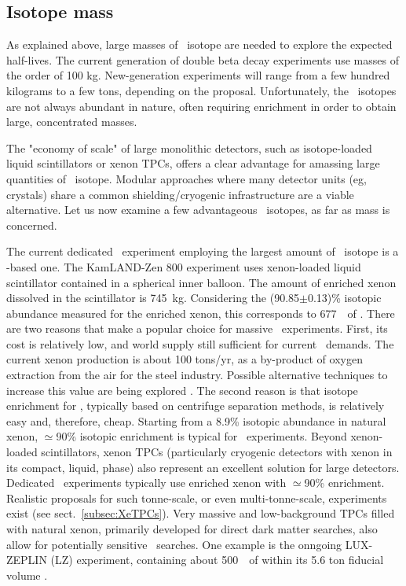 \subsection{Isotope mass} \label{subsec:isotope_mass}

As explained above, large masses of \bb\ isotope are needed to explore the expected half-lives. The current generation of double beta decay experiments use masses of the order of 100 kg. New-generation experiments will range from a few hundred kilograms to a few tons, depending on the proposal. Unfortunately, the \bb\ isotopes are not always abundant in nature, often requiring enrichment in order to obtain large, concentrated masses.

The "economy of scale" of large monolithic detectors, such as isotope-loaded liquid scintillators or xenon TPCs, offers a clear advantage for amassing large quantities of \bb\ isotope. Modular approaches where many detector units (eg, crystals) share a common shielding/cryogenic infrastructure are a viable alternative. Let us now examine a few advantageous \bb\ isotopes, as far as mass is concerned.

The current dedicated \bbonu\ experiment employing the largest amount of \bb\ isotope is a -based one. The KamLAND-Zen 800 experiment uses xenon-loaded liquid scintillator contained in a spherical inner balloon. The amount of enriched xenon dissolved in the scintillator is 745~kg. Considering the (90.85$\pm$0.13)\%  isotopic abundance measured for the enriched xenon, this corresponds to 677~\kgbb\ of  \cite{KamLAND-Zen:2022tow}. There are two reasons that make  a popular choice for massive \bbonu\ experiments. First, its cost is relatively low, and world supply still sufficient for current \bbonu\ demands. The current xenon production is about 100 tons/yr, as a by-product of oxygen extraction from the air for the steel industry. Possible alternative techniques to increase this value are being explored \cite{Avasthi:2021lgy}. The second reason is that isotope enrichment for , typically based on centrifuge separation methods, is relatively easy and, therefore, cheap. Starting from a 8.9\% isotopic abundance in natural xenon, $\simeq$90\%  isotopic enrichment is typical for \bbonu\ experiments. Beyond xenon-loaded scintillators, xenon TPCs (particularly cryogenic detectors with xenon in its compact, liquid, phase) also represent an excellent solution for large detectors. Dedicated \bbonu\ experiments typically use enriched xenon with $\simeq$90\% enrichment. Realistic proposals for such tonne-scale, or even multi-tonne-scale, experiments exist (see sect.~\ref{subsec:XeTPCs}). Very massive and low-background TPCs filled with natural xenon, primarily developed for direct dark matter searches, also allow for potentially sensitive \bbonu\ searches. One example is the onngoing LUX-ZEPLIN (LZ) experiment, containing about 500~\kgbb\ of  within its 5.6 ton fiducial volume \cite{LZ:2019qdm}.

